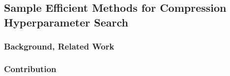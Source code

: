 \subsection{Sample Efficient Methods for Compression Hyperparameter Search}
\subsubsection{Background, Related Work}
\subsubsection{Contribution}